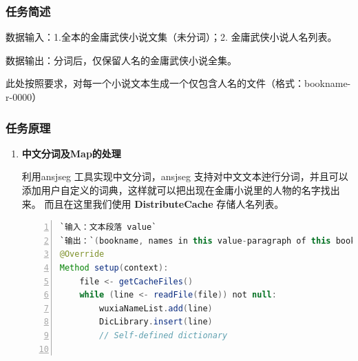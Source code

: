\documentclass{ctexart}
\begin{document}
	\subsubsection{任务简述}
	\par 数据输入：1.全本的金庸武侠小说文集（未分词）；2. 金庸武侠小说人名列表。 
	\par 数据输出：分词后，仅保留人名的金庸武侠小说全集。
	\par 此处按照要求，对每一个小说文本生成一个仅包含人名的文件（格式：bookname-r-0000）
	
	\subsubsection{任务原理}
	\begin{enumerate}[I]
		\item \textbf{中文分词及Map的处理}
		\par 利用ansjseg 工具实现中文分词，ansjseg 支持对中文文本迚行分词，并且可以添加用户自定义的词典，这样就可以把出现在金庸小说里的人物的名字找出来。
	    而且在这里我们使用 \textbf{DistributeCache} 存储人名列表。
	\begin{lstlisting}[language=java, numbers=left, numberstyle=\tiny, frame=shadowbox, basicstyle=\ttfamily, escapeinside=``] 
`输入：文本段落 value`
`输出：`(bookname, names in this value-paragraph of this book)		
@Override
Method setup(context):
	file <- getCacheFiles()
	while (line <- readFile(file)) not null:
		wuxiaNameList.add(line)
		DicLibrary.insert(line)
		// Self-defined dictionary


\end{lstlisting}
\end{enumerate}
\end{document}
